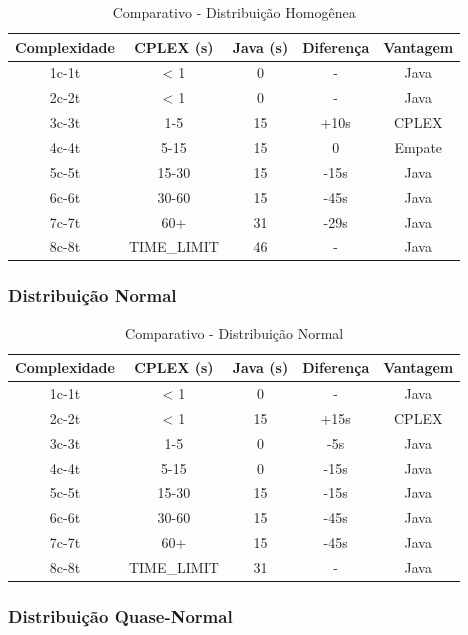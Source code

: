 \documentclass[12pt,a4paper]{article}
\begin{document}
\begin{table}[H]
\centering
\caption{Comparativo - Distribuição Homogênea}
\begin{tabular}{|c|c|c|c|c|}
\hline
\textbf{Complexidade} & \textbf{CPLEX (s)} & \textbf{Java (s)} & \textbf{Diferença} & \textbf{Vantagem} \\
\hline
1c-1t & < 1 & 0 & - & Java \\
2c-2t & < 1 & 0 & - & Java \\
3c-3t & 1-5 & 15 & +10s & CPLEX \\
4c-4t & 5-15 & 15 & 0 & Empate \\
5c-5t & 15-30 & 15 & -15s & Java \\
6c-6t & 30-60 & 15 & -45s & Java \\
7c-7t & 60+ & 31 & -29s & Java \\
8c-8t & TIME\_LIMIT & 46 & - & Java \\
\hline
\end{tabular}
\end{table}

\subsubsection{Distribuição Normal}

\begin{table}[H]
\centering
\caption{Comparativo - Distribuição Normal}
\begin{tabular}{|c|c|c|c|c|}
\hline
\textbf{Complexidade} & \textbf{CPLEX (s)} & \textbf{Java (s)} & \textbf{Diferença} & \textbf{Vantagem} \\
\hline
1c-1t & < 1 & 0 & - & Java \\
2c-2t & < 1 & 15 & +15s & CPLEX \\
3c-3t & 1-5 & 0 & -5s & Java \\
4c-4t & 5-15 & 0 & -15s & Java \\
5c-5t & 15-30 & 15 & -15s & Java \\
6c-6t & 30-60 & 15 & -45s & Java \\
7c-7t & 60+ & 15 & -45s & Java \\
8c-8t & TIME\_LIMIT & 31 & - & Java \\
\hline
\end{tabular}
\end{table}

\subsubsection{Distribuição Quase-Normal}
\end{document}
